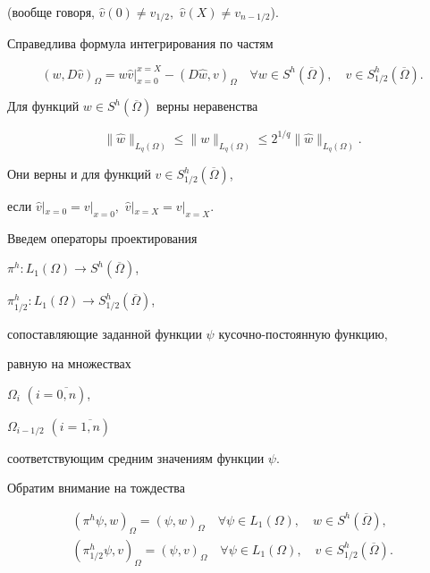 \documentclass[12pt]{article}
\theoremstyle{plain} %
\theoremstyle{definition}
\numberwithin{equation}{section}
\begin{document}
(вообще говоря, $\widehat v(0)\ne v_{1/2},$ $\widehat v(X)\ne v_{n-1/2}$).





Справедлива формула интегрирования по частям


\begin{equation}


(w, D\widehat v)_\Omega = w\widehat v|_{x=0}^{x=X} - (D\widehat w,v)_\Omega\quad


\forall w\in S^h(\overline\Omega),\quad v\in S^h_{1/2}(\overline\Omega).


\end{equation}





Для функций $w\in S^h(\overline\Omega)$ верны неравенства


\begin{equation}


\|\widehat w\|_{L_q(\Omega)}\le \|w\|_{L_q(\Omega)}\le


2^{1/q} \|\widehat w\|_{L_q(\Omega)}.


\end{equation}


Они верны и для функций $v\in S^h_{1/2}(\overline\Omega)$,


если $\widehat v|_{x=0}=v|_{x=0},$ $\widehat v|_{x=X}=v|_{x=X}$.





Введем операторы проектирования


$\pi^h: L_1(\Omega)\to S^h(\overline\Omega)$,


$\pi^h_{1/2}: L_1(\Omega)\to S^h_{1/2}(\overline\Omega)$,


сопоставляющие заданной функции $\psi$ кусочно-постоянную функцию,


равную на множествах


$\Omega_{i}$ $(i=\overline{0,n})$,


$\Omega_{i-1/2}$ $(i=\overline{1,n})$


соответствующим средним значениям функции $\psi$.


Обратим внимание на тождества


\begin{gather}


(\pi^h \psi, w)_{\Omega}=(\psi, w)_{\Omega}\quad


\forall \psi\in L_1(\Omega),\quad


w\in S^{h}(\overline\Omega), \\


%


(\pi^h_{1/2} \psi, v)_{\Omega}=(\psi, v)_{\Omega}\quad


\forall \psi\in L_1(\Omega),\quad


v\in S^{h}_{1/2}(\overline\Omega).


\end{gather}
\end{document}
